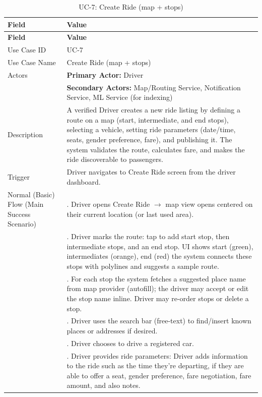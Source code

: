 \begin{longtable}{|>{\raggedright\arraybackslash}p{4cm}|>{\raggedright\arraybackslash}p{11cm}|}
\caption{UC-7: Create Ride (map + stops)}
\label{tab:uc-7} \\
\hline
\rowcolor{lightgray!30}
\textbf{Field} & \textbf{Value} \\
\hline
\endfirsthead
\hline
\rowcolor{lightgray!30}
\textbf{Field} & \textbf{Value} \\
\hline
\endhead
\hline
\endfoot
\hline
\endlastfoot
Use Case ID & UC-7 \\
\hline
Use Case Name & Create Ride (map + stops) \\
\hline
Actors & \textbf{Primary Actor:} Driver \\
& \textbf{Secondary Actors:} Map/Routing Service, Notification Service, ML Service (for indexing) \\
\hline
Description & A verified Driver creates a new ride listing by defining a route on a map (start, intermediate, and end stops), selecting a vehicle, setting ride parameters (date/time, seats, gender preference, fare), and publishing it. The system validates the route, calculates fare, and makes the ride discoverable to passengers. \\
\hline
Trigger & Driver navigates to Create Ride screen from the driver dashboard. \\
\hline
Normal (Basic) Flow (Main Success Scenario) & 1. Driver opens Create Ride $\rightarrow$ map view opens centered on their current location (or last used area). \\
& 2. Driver marks the route: tap to add start stop, then intermediate stops, and an end stop. UI shows start (green), intermediates (orange), end (red) the system connects these stops with polylines and suggests a sample route. \\
& 3. For each stop the system fetches a suggested place name from map provider (autofill); the driver may accept or edit the stop name inline. Driver may re-order stops or delete a stop. \\
& 4. Driver uses the search bar (free-text) to find/insert known places or addresses if desired. \\
& 5. Driver chooses to drive a registered car. \\
& 6. Driver provides ride parameters: Driver adds information to the ride such as the time they're departing, if they are able to offer a seat, gender preference, fare negotiation, fare amount, and also notes. \\

\end{longtable}
